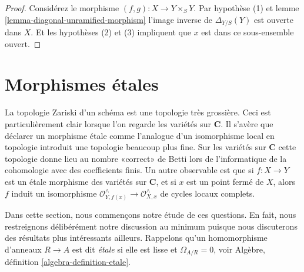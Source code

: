 \begin{proof}
Considérez le morphisme $(f, g) : X \to Y \times_S Y$. Par hypothèse (1) et lemme \ref{lemma-diagonal-unramified-morphism} l'image inverse de $\Delta_{Y/S}(Y)$ est ouverte dans $X$. Et les hypothèses (2) et (3) impliquent que $x$ est dans ce sous-ensemble ouvert.
\end{proof}










\section{Morphismes étales}
\label{section-etale}

\noindent
La topologie Zariski d'un schéma est une topologie très grossière. Ceci est particulièrement clair lorsque l'on regarde les variétés sur $\mathbf{C}$. Il s'avère que déclarer un morphisme \'etale comme l'analogue d'un isomorphisme local en topologie introduit une topologie beaucoup plus fine. Sur les variétés sur $\mathbf{C}$ cette topologie donne lieu au nombre «correct» de Betti lors de l'informatique de la cohomologie avec des coefficients finis. Un autre observable est que si $f : X \to Y$ est un \'etale morphisme des variétés sur $\mathbf{C}$, et si $x$ est un point fermé de $X$, alors $f$ induit un isomorphisme $\mathcal{O}^{\wedge}_{Y, f(x)} \to \mathcal{O}^{\wedge}_{X, x}$ de cycles locaux complets.

\medskip\noindent
Dans cette section, nous commençons notre étude de ces questions. En fait, nous restreignons délibérément notre discussion au minimum puisque nous discuterons des résultats plus intéressants ailleurs. Rappelons qu'un homomorphisme d'anneaux $R \to A$ est dit {\it \'etale} si elle est lisse et $\Omega_{A/R} = 0$, voir Algèbre, définition \ref{algebra-definition-etale}.

